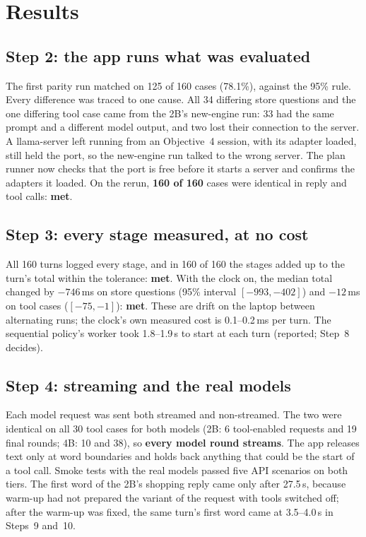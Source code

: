 \documentclass[11pt,a4paper]{article}
\newcommand{\met}{\textcolor{qaqua}{\textbf{met}}}
\begin{document}
\section{Results}\label{sec:results}

\subsection{Step 2: the app runs what was evaluated}
The first parity run matched on 125 of 160 cases (78.1\%), against the 95\% rule. Every difference was traced to one
cause. All 34 differing store questions and the one differing tool case came from the 2B's new-engine run: 33 had
the same prompt and a different model output, and two lost their connection to the server. A llama-server left running from an Objective~4 session, with its adapter
loaded, still held the port, so the new-engine run talked to the wrong server. The plan runner now checks that the port
is free before it starts a server and confirms the adapters it loaded. On the rerun, \textbf{160 of 160} cases were
identical in reply and tool calls: \met.

\subsection{Step 3: every stage measured, at no cost}
All 160 turns logged every stage, and in 160 of 160 the stages added up to the turn's total within the tolerance:
\met. With the clock on, the median total changed by $-746$\,ms on store questions (95\% interval $[-993, -402]$) and
$-12$\,ms on tool cases ($[-75, -1]$): \met. These are drift on the laptop between alternating runs; the clock's own
measured cost is 0.1--0.2\,ms per turn. The sequential policy's worker took 1.8--1.9\,s to start at each turn
(reported; Step~8 decides).

\subsection{Step 4: streaming and the real models}
Each model request was sent both streamed and non-streamed. The two were identical on all 30 tool cases for both
models (2B: 6 tool-enabled requests and 19 final rounds; 4B: 10 and 38), so \textbf{every model round streams}. The app
releases text only at word boundaries and holds back anything that could be the start of a tool call. Smoke tests with
the real models passed five API scenarios on both tiers. The first word of the 2B's shopping reply came only after
27.5\,s, because warm-up had not prepared the variant of the request with tools switched off; after the warm-up was
fixed, the same turn's first word came at 3.5--4.0\,s in Steps~9 and~10.
\end{document}
